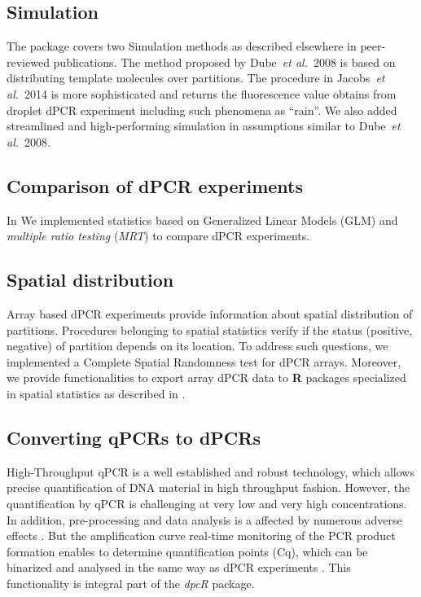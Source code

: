 \documentclass[a4,center,fleqn]{NAR}
\begin{document}
\subsection{Simulation}

The package covers two Simulation methods as described elsewhere in 
peer-reviewed publications. The method proposed by Dube~\textit{et al.}~2008 
\cite{dube_mathematical_2008} is based on distributing template molecules over 
partitions. The procedure in Jacobs~\textit{et al.}~2014 \cite{jacobs_2014} is 
more sophisticated and returns the fluorescence value obtains from droplet dPCR 
experiment including such phenomena as ``rain''. We also added streamlined and 
high-performing simulation in assumptions similar to Dube~\textit{et al.}~2008.

\subsection{Comparison of dPCR experiments}

In \cite{Burdukiewicz_tba} We implemented statistics based on Generalized Linear Models (GLM) and 
\textit{multiple ratio testing} (\textit{MRT}) to compare dPCR experiments. 

\subsection{Spatial distribution}

Array based dPCR experiments provide information about spatial distribution of 
partitions. Procedures belonging to spatial statistics verify if the status 
(positive, negative) of partition depends on its location. To address such 
questions, we implemented a Complete Spatial Randomness test for dPCR arrays. 
Moreover, we provide functionalities to export array dPCR data to \textbf{R} 
packages specialized in spatial statistics as described in 
\cite{Baddeley_Turner_2005}.

\subsection{Converting qPCRs to dPCRs}

High-Throughput qPCR is a well established and robust technology, which allows 
precise quantification of DNA material in high throughput fashion. However, the 
quantification by qPCR is challenging at very low and very high concentrations. 
In addition, pre-processing and data analysis is a affected by numerous adverse 
effects \cite{ruijter_2013, pabinger_survey_2014, spiess_impact_2015}. But the 
amplification curve real-time monitoring of the PCR product formation enables to 
determine quantification points (Cq), which can be binarized and analysed in the 
same way as dPCR experiments \cite{mojtahedi_2014}. This functionality is 
integral part of the \textit{dpcR} package.
\end{document}
